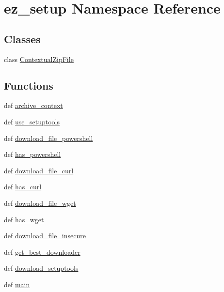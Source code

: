 \hypertarget{namespaceez__setup}{}\section{ez\+\_\+setup Namespace Reference}
\label{namespaceez__setup}
\subsection*{Classes}
\begin{DoxyCompactItemize}
\item 
class \hyperlink{classez__setup_1_1ContextualZipFile}{Contextual\+Zip\+File}
\end{DoxyCompactItemize}
\subsection*{Functions}
\begin{DoxyCompactItemize}
\item 
def \hyperlink{namespaceez__setup_ae18b04bbb1a3b9c10ef2d49f1a5708a6}{archive\+\_\+context}
\item 
def \hyperlink{namespaceez__setup_a66dbd61665af1fc8f89b60d4978bee40}{use\+\_\+setuptools}
\item 
def \hyperlink{namespaceez__setup_a0a8fa63ced369f4a9f127cb47ba9f1ae}{download\+\_\+file\+\_\+powershell}
\item 
def \hyperlink{namespaceez__setup_a5d19bfdc88ee956f5eb4763baa3f09ea}{has\+\_\+powershell}
\item 
def \hyperlink{namespaceez__setup_acd99efacf64c2fe240771fed7550d72d}{download\+\_\+file\+\_\+curl}
\item 
def \hyperlink{namespaceez__setup_a664398bbe752e72f4b5fd33167a7dcd2}{has\+\_\+curl}
\item 
def \hyperlink{namespaceez__setup_aed59f6dd78dd17fbd41600cc5ef0659e}{download\+\_\+file\+\_\+wget}
\item 
def \hyperlink{namespaceez__setup_a14daa21bff58dafa5ce12fa28856950f}{has\+\_\+wget}
\item 
def \hyperlink{namespaceez__setup_a32cbddfc0a7560d06f82ebd360e48f87}{download\+\_\+file\+\_\+insecure}
\item 
def \hyperlink{namespaceez__setup_a1a51ad9e863f344a7f78e3c4b633be07}{get\+\_\+best\+\_\+downloader}
\item 
def \hyperlink{namespaceez__setup_a5676d254d60c5d43f5ed67e3141878d2}{download\+\_\+setuptools}
\item 
def \hyperlink{namespaceez__setup_a560f04bfc77f23edc5ff771a484dd3d4}{main}
\end{DoxyCompactItemize}
